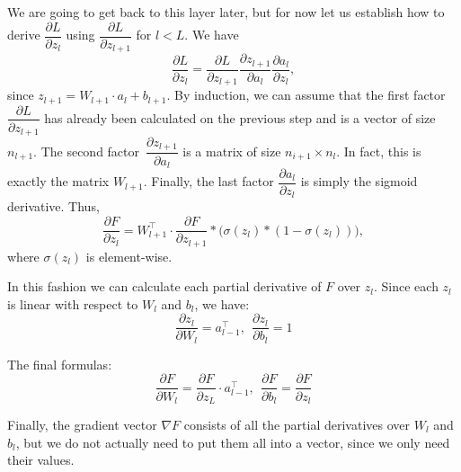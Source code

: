\documentclass[11pt]{amsart}
\begin{document}
We are going to get back to this layer later, but for now let us establish how to derive $\dfrac{\partial L}{\partial z_l}$ using $\dfrac{\partial L}{\partial z_{l + 1}}$ for $l < L$. We have
$$\dfrac{\partial L}{\partial z_l} = \dfrac{\partial L}{\partial z_{l + 1}} \dfrac{\partial z_{l + 1}}{\partial a_l} \dfrac{\partial a_l}{\partial z_l},$$
since $z_{l + 1} = W_{l + 1} \cdot a_l + b_{l + 1}$. By induction, we can assume that the first factor $\dfrac{\partial L}{\partial z_{l + 1}}$ has already been calculated on the previous step and is a vector of size $n_{l + 1}$. The second factor~$\dfrac{\partial z_{l + 1}}{\partial a_l}$ is a matrix of size $n_{i + 1} \times n_l$. In fact, this is exactly the matrix $W_{l + 1}$. Finally, the last factor $\dfrac{\partial a_l}{\partial z_l}$ is simply the sigmoid derivative. Thus,
$$\dfrac{\partial F}{\partial z_l} = W_{l + 1}^\top \cdot \dfrac{\partial F}{\partial z_{l + 1}} \ast \bigl( \sigma(z_l) \ast (1 - \sigma(z_l)) \bigr),$$
where $\sigma(z_l)$ is element-wise.

In this fashion we can calculate each partial derivative of $F$ over $z_l$. Since each $z_l$ is linear with respect to $W_l$ and $b_l$, we have:
$$\dfrac{\partial z_l}{\partial W_l} = a_{l - 1}^\top, \:\: \dfrac{\partial z_l}{\partial b_l} = 1$$

The final formulas:
$$\dfrac{\partial F}{\partial W_l} = \dfrac{\partial F}{\partial z_L} \cdot a_{l - 1}^\top, \:\: \dfrac{\partial F}{\partial b_l} = \dfrac{\partial F}{\partial z_l}$$

Finally, the gradient vector $\nabla F$ consists of all the partial derivatives over $W_l$ and $b_l$, but we do not actually need to put them all into a vector, since we only need their values.
\end{document}

